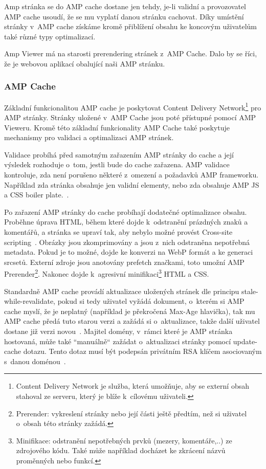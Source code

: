 Amp stránka se do AMP cache dostane jen tehdy, je-li validní a provozovatel AMP cache usoudí, že se mu vyplatí danou stránku cachovat. Díky umístění stránky v~AMP cache získáme kromě přiblížení obsahu ke koncovým uživatelům také různé typy optimalizací.

Amp Viewer má na starosti prerendering stránek z~AMP Cache. Dalo by se říci, že je webovou aplikací obalující naši AMP stránku. 

\subsubsection*{AMP Cache}
Základní funkcionalitou AMP cache je poskytovat Content Delivery Network\footnote{Content Delivery Network je služba, která umožňuje, aby se externí obsah stahoval ze serveru, který je blíže k~cílovému uživateli.} pro AMP stránky. Stránky uložené v~AMP Cache jsou poté přístupné pomocí AMP Vieweru.
Kromě této základní funkcionality AMP Cache také poskytuje mechanismy pro validaci a optimalizaci AMP stránek.

Validace probíhá před samotným zařazením AMP stránky do cache a její výsledek rozhoduje o~tom, jestli bude do cache zařazena.
AMP validace kontroluje, zda není porušeno některé z~omezení a požadavků AMP frameworku. Například zda stránka obsahuje jen validní elementy, nebo zda obsahuje AMP JS a CSS boiler plate.~\cite{AMPCache}.

Po zařazení AMP stránky do cache probíhají dodatečné optimalizace obsahu.
Proběhne úprava HTML, během které dojde k~odstranění prázdných znaků a komentářů, a stránka se upraví tak, aby nebylo možné provést Cross-site scripting~\cite{whyAMPCache}.
Obrázky jsou zkomprimovány a jsou z~nich odstraněna nepotřebná metadata. Pokud je to možné, dojde ke konverzi na WebP formát a ke generaci srcsetů.
Externí zdroje jsou anotovány prefetch značkami, toto umožní AMP Prerender\footnote{Prerender: vykreslení stránky nebo její části ještě předtím, než si uživatel o~obsah této stránky zažádá.}.
Nakonec dojde k~agresivní minifikaci\footnote{Minifikace: odstranění nepotřebných prvků (mezery, komentáře,..) ze zdrojového kódu. Také může například docházet ke zkrácení názvů proměnných nebo funkcí.} HTML a CSS.

Standardně AMP cache provádí aktualizace uložených stránek dle principu stale-while-revalidate, pokud si tedy uživatel vyžádá dokument, o~kterém si AMP cache myslí, že je neplatný (například  je překročená Max-Age hlavička), tak mu AMP cache předá tuto starou verzi a zažádá si o~aktualizace, takže další uživatel dostane již verzi novou~\cite{AMPUpdate}.
Majitel domény, v~rámci které je AMP stránka hostovaná, může také “manuálně“ zažádat o~aktualizaci stránky pomocí update-cache dotazu. Tento dotaz musí být podepsán privátním RSA klíčem asociovaným s~danou doménou~\cite{AMPUpdateUrl}.

